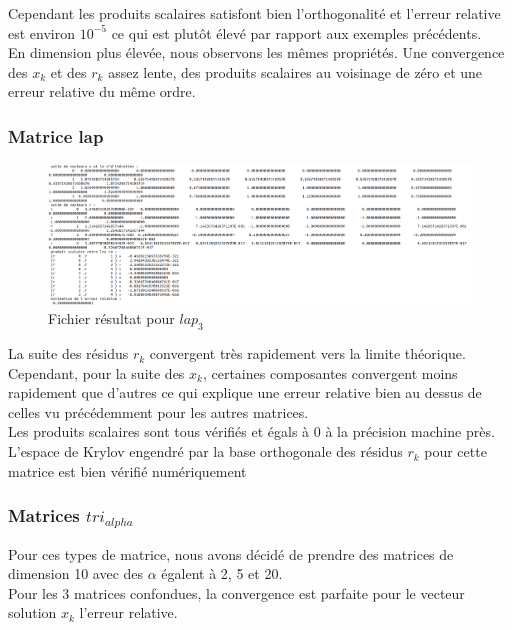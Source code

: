 \documentclass[12,french]{report}
\begin{document}
Cependant les produits scalaires satisfont bien l'orthogonalité et l'erreur relative est environ $10^{-5}$ ce qui est plutôt élevé par rapport aux exemples précédents.\\

En dimension plus élevée, nous observons les mêmes propriétés. Une convergence des $x_k$ et des $r_k$ assez lente, des produits scalaires au voisinage de zéro et une erreur relative du même ordre.

\subsubsection{Matrice lap}

\begin{figure}[H]
	\centering
	\includegraphics[width=1\textwidth]{./Images/Fichier_res_lap_3}
	\caption{Fichier résultat pour $lap_3$}
\end{figure}\vspace{0.2cm}

La suite des résidus $r_k$ convergent très rapidement vers la limite théorique. Cependant, pour la suite des $x_k$, certaines composantes convergent moins rapidement que d'autres ce qui explique une erreur relative bien au dessus de celles vu précédemment pour les autres matrices.\\

Les produits scalaires sont tous vérifiés et égals à 0 à la précision machine près. L'espace de Krylov engendré par la base orthogonale des résidus $r_k$ pour cette matrice est bien vérifié numériquement

\subsubsection{Matrices $tri_{alpha}$}

Pour ces types de matrice, nous avons décidé de prendre des matrices de dimension 10 avec des $\alpha$ égalent à 2, 5 et 20.\\

Pour les 3 matrices confondues, la convergence est parfaite pour le vecteur solution $x_k$ l'erreur relative. \\
\end{document}
